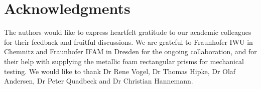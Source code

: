\documentclass[review]{elsarticle}
\begin{document}









\printnomenclature[1.5cm]

\section*{Acknowledgments}

The authors would like to express heartfelt gratitude to our academic colleagues for their feedback and fruitful discussions. We are grateful to Fraunhofer IWU in Chemnitz and Fraunhofer IFAM in Dresden for the ongoing collaboration, and for their help with supplying the metallic foam rectangular prisms for mechanical testing. We would like to thank Dr Rene Vogel, Dr Thomas Hipke, Dr Olaf Andersen, Dr Peter Quadbeck and Dr Christian Hannemann.
\end{document}

